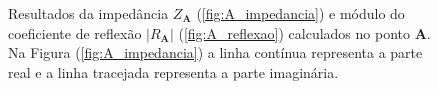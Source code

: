 
\newcommand\scalex{1}
\newcommand\scaley{1}
\newcommand\scaleA{0.5}

\begin{figure}
\begin{subfigure}{\scaleA \textwidth}
  
\end{subfigure}%
\begin{subfigure}{\scaleA \textwidth}
  
\end{subfigure}
\caption[Resultados de reflexão no ponto \textbf{A}]{Resultados da impedância $Z_{\textbf{A}}$ (\ref{fig:A_impedancia}) e módulo do coeficiente de reflexão $|R_{\textbf{A}}|$ (\ref{fig:A_reflexao}) calculados no ponto $\textbf{A}$. Na Figura (\ref{fig:A_impedancia}) a linha contínua representa a parte real e a linha tracejada representa a parte imaginária.}
\label{fig:resultados_A}
\end{figure}

